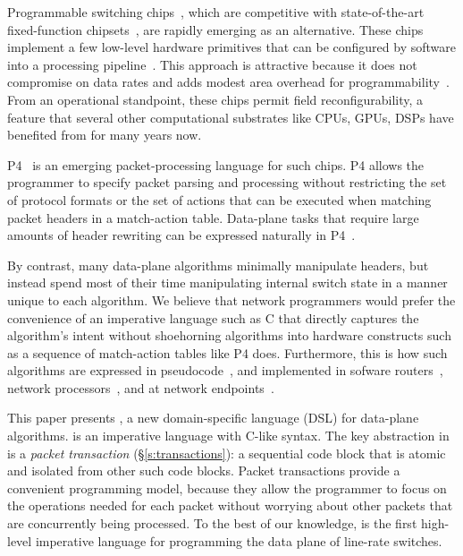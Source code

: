 Programmable switching chips~\cite{flexpipe, xpliant, rmt, corsa, uadp,
algo_logic}, which are competitive with state-of-the-art fixed-function
chipsets~\cite{trident, tomahawk, mellanox}, are rapidly emerging as an
alternative. These chips implement a few low-level hardware primitives that can
be configured by software into a processing
pipeline~\cite{xpliant_sdk,xpliant_sdk2,intel_sdk}.  This approach is
attractive because it does not compromise on data rates and adds modest area
overhead for programmability~\cite{rmt}. From an operational standpoint, these
chips permit field reconfigurability, a feature that several other
computational substrates like CPUs, GPUs, DSPs have benefited from for many
years now.

P4~\cite{p4, p4spec} is an emerging packet-processing language for such chips.
P4 allows the programmer to specify packet parsing and processing without
restricting the set of protocol formats or the set of actions that can be
executed when matching packet headers in a match-action table. Data-plane tasks
that require large amounts of header rewriting can be expressed naturally in
P4~\cite{dc_p4}.

By contrast, many data-plane algorithms minimally manipulate headers, but
instead spend most of their time manipulating internal switch state in a manner
unique to each algorithm. We believe that network programmers would prefer the
convenience of an imperative language such as C that directly captures the
algorithm's intent without shoehorning algorithms into hardware constructs such
as a sequence of match-action tables like P4 does.  Furthermore, this is how
such algorithms are expressed in pseudocode~\cite{red, csfq, codel_code, avq,
blue}, and implemented in sofware routers~\cite{click, dpdk, routebricks},
network processors~\cite{packetc, nova}, and at network endpoints~\cite{qdisc}.

This paper presents \pktlanguage, a new domain-specific language (DSL) for
data-plane algorithms.  \pktlanguage is an imperative language with C-like
syntax. The key abstraction in \pktlanguage is a {\em packet transaction}
(\S\ref{s:transactions}): a sequential code block that is atomic and isolated
from other such code blocks. Packet transactions provide a convenient
programming model, because they allow the programmer to focus on the operations
needed for each packet without worrying about other packets that are
concurrently being processed. To the best of our knowledge, \pktlanguage is the
first high-level imperative language for programming the data plane of
line-rate switches.

